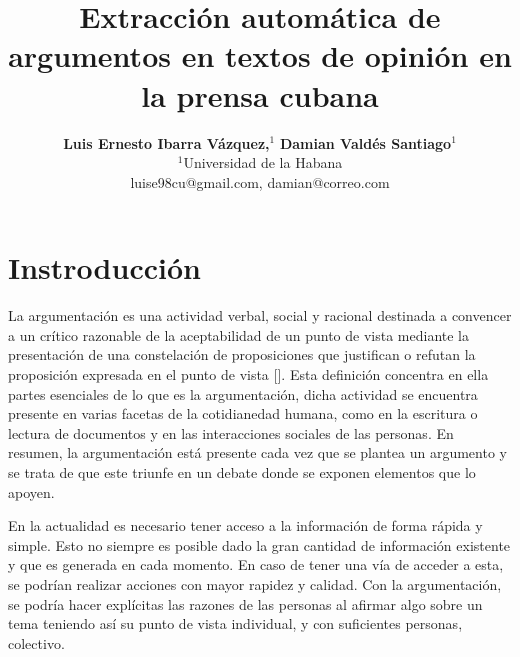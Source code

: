 \documentclass[a4paper,11pt,twocolumn,twoside]{article}
\title{Extracción automática de argumentos en textos de opinión en la prensa cubana}
\author {\textbf{Luis Ernesto Ibarra Vázquez,$^1$} \textbf{Damian Valdés Santiago$^1$}\\
$^1$Universidad de la Habana\\
luise98cu@gmail.com, damian@correo.com\\ %
}
\begin{document}



\label{firstpage} \maketitle

%

\section{Instroducción}

La argumentación es una actividad verbal, social y racional destinada a convencer 
a un crítico razonable de la aceptabilidad de un punto de vista mediante la presentación 
de una constelación de proposiciones que justifican o refutan la proposición expresada 
en el punto de vista [\cite{van2004systematic}]. Esta definición concentra en ella 
partes esenciales de lo que es la argumentación, dicha actividad se encuentra presente
en varias facetas de la cotidianedad humana, como en la escritura o lectura de documentos y
en las interacciones sociales de las personas. En resumen, la argumentación está presente 
cada vez que se plantea un argumento y se trata de que este triunfe en un debate donde 
se exponen elementos que lo apoyen.   

En la actualidad es necesario tener acceso a la información
de forma rápida y simple. Esto no siempre es posible dado la gran cantidad de información existente y
que es generada en cada momento. En caso de tener una vía de acceder a esta, se podrían realizar acciones
con mayor rapidez y calidad. Con la argumentación, se podría hacer explícitas las razones de las personas 
al afirmar algo sobre un tema teniendo así su punto de vista individual, y con suficientes personas, colectivo.

\end{document}
